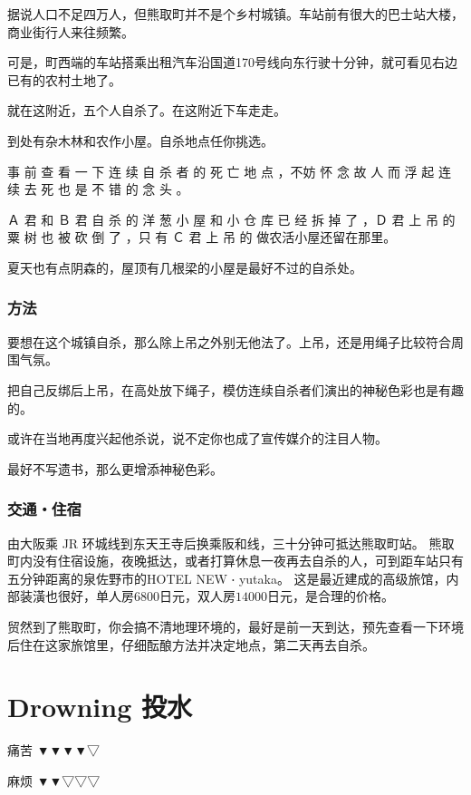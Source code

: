 \documentclass[UTF8]{ctexart}
\begin{document}
据说人口不足四万人，但熊取町并不是个乡村城镇。车站前有很大的巴士站大楼，商业街行人来往频繁。

可是，町西端的车站搭乘出租汽车沿国道170号线向东行驶十分钟，就可看见右边已有的农村土地了。

就在这附近，五个人自杀了。在这附近下车走走。

到处有杂木林和农作小屋。自杀地点任你挑选。

事 前 查 看 一 下 连 续 自 杀 者 的 死 亡 地 点 ，不妨 怀 念 故 人 而 浮 起 连 续 去 死 也 是 不 错 的 念 头 。

Ａ 君 和 Ｂ 君 自 杀 的 洋 葱 小 屋 和 小 仓 库 已 经 拆 掉 了 ，Ｄ 君 上 吊 的 粟 树 也 被 砍 倒 了 ，只 有 Ｃ 君 上 吊 的 做农活小屋还留在那里。

夏天也有点阴森的，屋顶有几根梁的小屋是最好不过的自杀处。

\subsubsection{方法}

要想在这个城镇自杀，那么除上吊之外别无他法了。上吊，还是用绳子比较符合周围气氛。

把自己反绑后上吊，在高处放下绳子，模仿连续自杀者们演出的神秘色彩也是有趣的。

或许在当地再度兴起他杀说，说不定你也成了宣传媒介的注目人物。

最好不写遗书，那么更增添神秘色彩。

\subsubsection{交通‧住宿}

由大阪乘 JR 环城线到东天王寺后换乘阪和线，三十分钟可抵达熊取町站。
熊取町内没有住宿设施，夜晚抵达，或者打算休息一夜再去自杀的人，可到距车站只有五分钟距离的泉佐野市的HOTEL NEW ‧ yutaka。
这是最近建成的高级旅馆，内部装潢也很好，单人房$6800$日元，双人房$14000$日元，是合理的价格。

贸然到了熊取町，你会搞不清地理环境的，最好是前一天到达，预先查看一下环境后住在这家旅馆里，仔细酝酿方法并决定地点，第二天再去自杀。


\newpage

\section{Drowning 投水}

痛苦 ▼▼▼▼▽

麻烦 ▼▼▽▽▽
\end{document}
